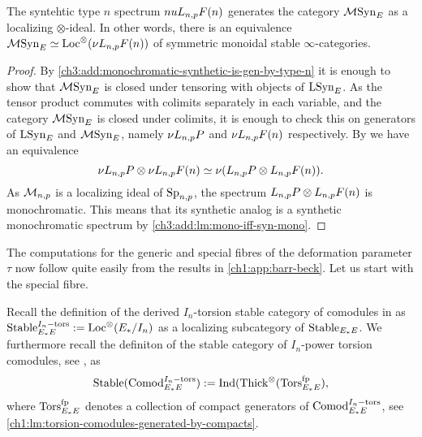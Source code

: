 \begin{lemma}
    The syntehtic type $n$ spectrum $nu L_{n,p} F(n)$ generates the category $\mathcal{M}\mathrm{Syn}_{E}$ as a localizing $\otimes$-ideal. In other words, there is an equivalence $\mathcal{M}\mathrm{Syn}_{E} \simeq \operatorname{Loc}^\otimes(\nu L_{n,p} F(n))$ of symmetric monoidal stable $\infty$-categories. 
\end{lemma}
\begin{proof}
    By \cref{ch3:add:monochromatic-synthetic-is-gen-by-type-n} it is enough to show that $\mathcal{M}\mathrm{Syn}_{E}$ is closed under tensoring with objects of $\mathrm{LSyn}_{E}$. As the tensor product commutes with colimits separately in each variable, and the category $\mathcal{M}\mathrm{Syn}_{E}$ is closed under colimits, it is enough to check this on generators of $\mathrm{LSyn}_{E}$ and $\mathcal{M}\mathrm{Syn}_{E}$, namely $\nu L_{n,p} P$ and $\nu L_{n,p} F(n)$ respectively. By \cite[4.24]{pstragowski_2022} we have an equivalence 
    \[\nu L_{n,p} P \otimes \nu L_{n,p} F(n) \simeq \nu(L_{n,p} P \otimes L_{n,p} F(n)).\]
    As $\mathcal{M}_{n,p}$ is a localizing ideal of $\mathrm{Sp}_{n,p}$, the spectrum $L_{n,p} P \otimes L_{n,p} F(n)$ is monochromatic. This means that its synthetic analog is a synthetic monochromatic spectrum by \cref{ch3:add:lm:mono-iff-syn-mono}. 
\end{proof}

The computations for the generic and special fibres of the deformation parameter $\tau$ now follow quite easily from the results in \cref{ch1:app:barr-beck}. Let us start with the special fibre. 

Recall the definition of the derived $I_n$-torsion stable category of comodules in \cite[2.4]{barthel-heard-valenzuela_2020} as $\mathrm{Stable}_{E_*E}^{I_n-\mathrm{tors}} := \operatorname{Loc}^\otimes(E_{*}/I_n)$ as a localizing subcategory of $\mathrm{Stable}_{E_*E}$. We furthermore recall the definiton of the stable category of $I_n$-power torsion comodules, see \cite[3.5]{barthel-heard-valenzuela_2020}, as 
\[\mathrm{Stable}(\mathrm{Comod}_{E_*E}^{I_n-\mathrm{tors}}) := \operatorname{Ind}(\operatorname{Thick}^\otimes(\mathrm{Tors}_{E_*E}^{\mathrm{fp}}),\]
where $\mathrm{Tors}_{E_*E}^{\mathrm{fp}}$ denotes a collection of compact generators of $\mathrm{Comod}_{E_*E}^{I_n-\mathrm{tors}}$, see \cref{ch1:lm:torsion-comodules-generated-by-compacts}. 


